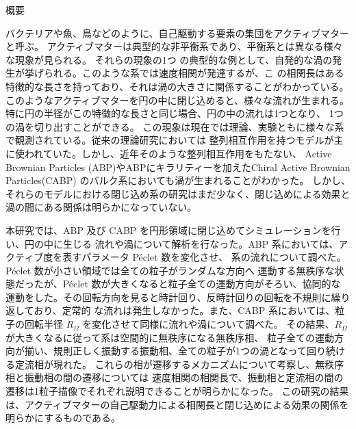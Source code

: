 \documentclass[/Users/ikedahajime/GitHub/reserch/master_report/thesis]{subfiles}
\begin{document}
\begin{center}
\Large{概要}
\end{center}
\normalsize
\thispagestyle{empty}
バクテリアや魚、鳥などのように、自己駆動する要素の集団をアクティブマターと呼ぶ。
アクティブマターは典型的な非平衡系であり、平衡系とは異なる様々な現象が見られる。
それらの現象の1つ
の典型的な例として、自発的な渦の発生が挙げられる。このような系では速度相関が発達するが、こ
の相関長はある特徴的な長さを持っており、それは渦の大きさに関係することがわかっている。
このようなアクティブマターを円の中に閉じ込めると、様々な流れが生まれる。
特に円の半径がこの特徴的な長さと同じ場合、円の中の流れは1つとなり、
1つの渦を切り出すことができる。
この現象は現在では理論、実験ともに様々な系で観測されている。従来の理論研究においては
整列相互作用を持つモデルが主に使われていた。しかし、近年そのような整列相互作用をもたない、
Active Brownian Particles (ABP)やABPにキラリティーを加えたChiral Active Brownian Particles(CABP)
のバルク系においても渦が生まれることがわかった\cite{szamelLongrangedVelocityCorrelations2021,szamelLongrangedVelocityCorrelations2021,kurodaAnomalousFluctuationsHomogeneous2023,kurodaLongrangeTranslationalOrder2024}。
しかし、それらのモデルにおける閉じ込め系の研究はまだ少なく、閉じ込めによる効果と渦の間にある関係は明らかになっていない。


本研究では、ABP 及び CABP を円形領域に閉じ込めてシミュレーションを行い、円の中に生じる
流れや渦について解析を行なった。ABP 系においては、アクティブ度を表すパラメータ Péclet 数を変化させ、
系の流れについて調べた。
Péclet 数が小さい領域では全ての粒子がランダムな方向へ
運動する無秩序な状態だったが、Péclet 数が大きくなると粒子全ての運動方向がそろい、協同的な
運動をした。その回転方向を見ると時計回り、反時計回りの回転を不規則に繰り返しており、定常的
な流れは発生しなかった。また、CABP 系においては、粒子の回転半径 $R_\Omega$ を変化させて同様に流れや渦について調べた。
その結果、$R_\Omega$ が大きくなるに従って系は空間的に無秩序になる無秩序相、
粒子全ての運動方向が揃い、規則正しく振動する振動相、全ての粒子が1つの渦となって回り続ける定流相が現れた。
これらの相が遷移するメカニズムについて考察し、無秩序相と振動相の間の遷移については
速度相関の相関長で、振動相と定流相の間の遷移は1粒子描像でそれぞれ説明できることが明らかになった。
この研究の結果は、アクティブマターの自己駆動力による相関長と閉じ込めによる効果の関係を明らかにするものである。
\end{document}
